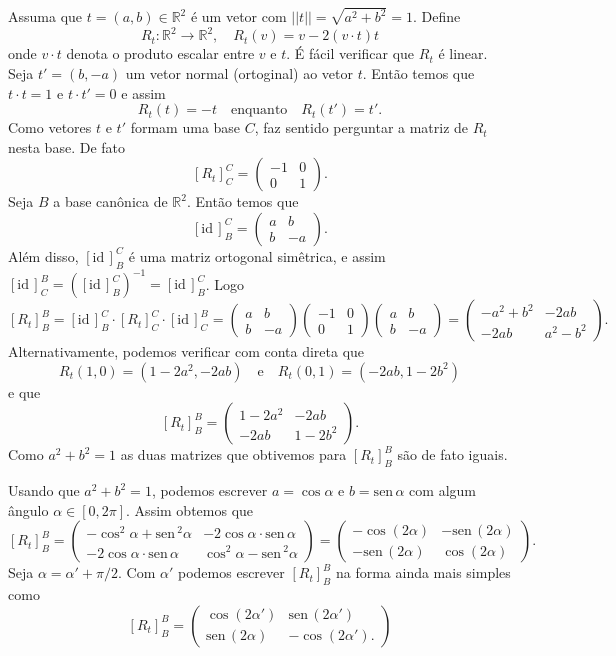 \documentclass[12pt]{amsart}
\newcommand{\R}{\mathbb R}
\newcommand{\id}{\mbox{id}\,}
\newcommand{\sen}{\mbox{sen}\,}
\theoremstyle{definition}
\begin{document}
Assuma que $t=(a,b)\in\R^2$ é um vetor com $||t||=\sqrt{a^2+b^2}=1$. Define 
\[
    R_t:\R^2\to \R^2,\quad R_t(v)=v-2(v\cdot t)t
\] 
onde $v\cdot t$ denota o produto escalar entre $v$ e $t$. É fácil verificar que $R_t$ é linear. 
Seja $t'=(b,-a)$ um vetor normal (ortoginal) ao vetor $t$. Então temos que $t\cdot t=1$ e $t\cdot t'=0$  
e assim 
\[
    R_t(t)=-t\quad\mbox{enquanto}\quad R_t(t')=t'.
\] 
Como vetores $t$  e $t'$ formam uma base $C$, faz sentido perguntar a matriz de $R_t$ nesta base. De fato 
\[
    [R_t]_C^C=\begin{pmatrix} -1 & 0 \\ 0 & 1\end{pmatrix}.
\]  
Seja $B$ a base canônica de $\R^2$. Então temos que 
\[
    [\id]_B^C=\begin{pmatrix} a & b \\ b & -a \end{pmatrix}.
\]
Além disso, $[\id]_B^C$ é uma matriz ortogonal simêtrica, e assim $[\id]_C^B=([\id]_B^C)^{-1}=[\id]_B^C$. 
Logo 
\[
    [R_t]_B^B=[\id]_B^C \cdot [R_t]_C^C\cdot [\id]_C^B=
    \begin{pmatrix} a & b \\ b & -a \end{pmatrix}\begin{pmatrix} -1 & 0 \\ 0 & 1\end{pmatrix}
    \begin{pmatrix} a & b \\ b & -a \end{pmatrix}=\begin{pmatrix}-a^2+b^2 & -2ab \\ -2ab & a^2-b^2
    \end{pmatrix}.
\]
Alternativamente, podemos verificar com conta direta que 
\[
    R_t(1,0)=(1-2a^2,-2ab)\quad\mbox{e}\quad R_t(0,1)=(-2ab,1-2b^2)
\]
e que 
\[
    [R_t]_B^B=\begin{pmatrix} 1-2a^2 & -2ab \\ -2ab & 1-2b^2\end{pmatrix}.
\]
Como $a^2+b^2=1$ as duas matrizes que obtivemos para $[R_t]_B^B$ são de fato iguais. 

Usando que $a^2+b^2=1$, podemos escrever $a=\cos\alpha$ e $b=\sen\alpha$ com algum ângulo $\alpha\in[0,2\pi]$.
Assim obtemos que 
\[ 
    [R_t]_B^B=\begin{pmatrix} -\cos^2\alpha +\sen^2\alpha & -2\cos \alpha\cdot \sen\alpha\\ 
        -2\cos \alpha\cdot \sen\alpha & \cos^2\alpha-\sen^2\alpha\end{pmatrix}
        =\begin{pmatrix}-\cos(2\alpha) & -\sen(2\alpha) \\ -\sen(2\alpha) & \cos(2\alpha)
        \end{pmatrix}.
\]
Seja $\alpha=\alpha'+\pi/2$. Com $\alpha'$ podemos escrever $[R_t]_B^B$ na forma ainda mais simples 
como 
\[
    [R_t]_B^B=\begin{pmatrix}\cos(2\alpha') & \sen(2\alpha') \\ \sen(2\alpha) & -\cos(2\alpha').
    \end{pmatrix}
\]
\end{document}
